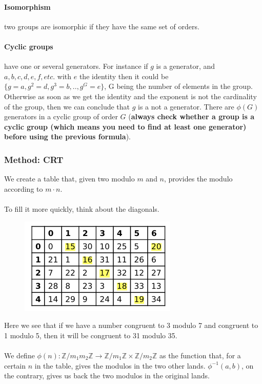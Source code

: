 \documentclass{article}
\begin{document}
\paragraph{Isomorphism} two groups are isomorphic if they have the same set of orders.

\paragraph{Cyclic groups} have one or several generators. For instance if $g$ is a generator, and $a, b, c, d, e, f, etc.$ with $e$ the identity then it could be $\{ g = a, g^2 = d, g^3 = b, .., g^G = e \}$, G being the number of elements in the group. Otherwise as soon as we get the identity and the exponent is not the cardinality of the group, then we can conclude that $g$ is a not a generator. There are $\phi(G)$ generators in a cyclic group of order $G$ (\textbf{always check whether a group is a cyclic group (which means you need to find at least one generator) before using the previous formula}).

\subsubsection{Method: CRT}

We create a table that, given two modulo \( m \) and \( n \), provides the modulo according to \( m \cdot n \).\\\\
To fill it more quickly, think about the diagonals.

\begin{figure}[h]
    \centering
    \includegraphics[width=0.5\linewidth]{crt.png}
    \label{fig:enter-label}
\end{figure}

Here we see that if we have a number congruent to 3 modulo 7 and congruent to 1 modulo 5, then it will be congruent to 31 modulo 35.\\\\
We define \(\phi(n) : \mathbb{Z}/m_1m_2\mathbb{Z} \rightarrow \mathbb{Z}/m_1\mathbb{Z} \times \mathbb{Z}/m_2\mathbb{Z}\) as the function that, for a certain \( n \) in the table, gives the modulos in the two other lands.
\(\phi^{-1}(a, b)\), on the contrary, gives us back the two modulos in the original lands.
\end{document}
